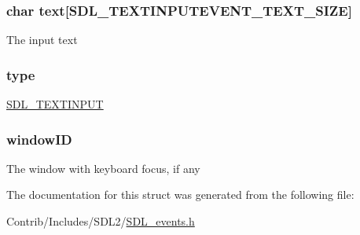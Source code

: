 \subsubsection[{\texorpdfstring{text}{text}}]{\setlength{\rightskip}{0pt plus 5cm}char text\mbox{[}S\+D\+L\+\_\+\+T\+E\+X\+T\+I\+N\+P\+U\+T\+E\+V\+E\+N\+T\+\_\+\+T\+E\+X\+T\+\_\+\+S\+I\+ZE\mbox{]}}\hypertarget{struct_s_d_l___text_input_event_aaef0f36c93cbd7458d7ff27dc412bbe7}{}\label{struct_s_d_l___text_input_event_aaef0f36c93cbd7458d7ff27dc412bbe7}
The input text 
\subsubsection[{\texorpdfstring{type}{type}}]{ type}\hypertarget{struct_s_d_l___text_input_event_aa40a9b05c3154032b9f2d7220e9f08dc}{}\label{struct_s_d_l___text_input_event_aa40a9b05c3154032b9f2d7220e9f08dc}
\hyperlink{_s_d_l__events_8h_a3b589e89be6b35c02e0dd34a55f3fccaa4fa2570088f6b9cbd109ae91b511368f}{S\+D\+L\+\_\+\+T\+E\+X\+T\+I\+N\+P\+UT} 
\subsubsection[{\texorpdfstring{window\+ID}{windowID}}]{ window\+ID}\hypertarget{struct_s_d_l___text_input_event_a78d9995068d6f40cd78bb8db7351b0a1}{}\label{struct_s_d_l___text_input_event_a78d9995068d6f40cd78bb8db7351b0a1}
The window with keyboard focus, if any 

The documentation for this struct was generated from the following file\+:\begin{DoxyCompactItemize}
\item 
Contrib/\+Includes/\+S\+D\+L2/\hyperlink{_s_d_l__events_8h}{S\+D\+L\+\_\+events.\+h}\end{DoxyCompactItemize}
